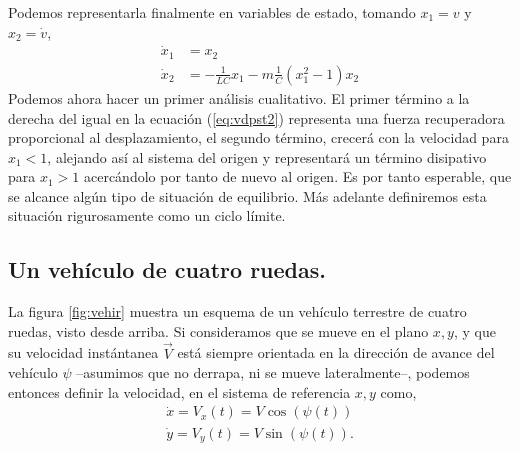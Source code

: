 Podemos representarla finalmente en variables de estado, tomando $x_1=v$ y $x_2=\dot{v}$,
\begin{align}
\dot{x}_1 &= x_2\\
\dot{x}_2 &= -\frac{1}{LC}x_1 - m\frac{1}{C}(x_1^2-1)x_2 \label{eq:vdpst2}
\end{align}
Podemos ahora hacer un primer análisis cualitativo. El primer término a la derecha del igual en  la ecuación (\ref{eq:vdpst2}) representa una fuerza recuperadora proporcional al desplazamiento, el segundo término, crecerá con la velocidad para $x_1 < 1$, alejando así al sistema del origen  y representará un término disipativo para $x_1 > 1$ acercándolo por tanto de nuevo al origen. Es por tanto esperable, que se alcance
algún tipo de situación de equilibrio. Más adelante definiremos esta situación rigurosamente como un ciclo límite. 
\subsection{Un vehículo de cuatro ruedas. }
La figura \ref{fig:vehir} muestra un esquema de un vehículo terrestre de cuatro ruedas, visto desde arriba. Si consideramos que se mueve en el plano $x,y$, y que su velocidad instántanea $\vec{V}$ está siempre orientada en la dirección de avance del vehículo $\psi$ --asumimos que no derrapa, ni se mueve lateralmente--, podemos entonces definir la velocidad, en el sistema de referencia $x,y$ como,
\begin{align}
\dot{x} = V_x(t) = V\cos(\psi(t))\\
\dot{y} = V_y(t) = V\sin(\psi(t)).
\end{align}

